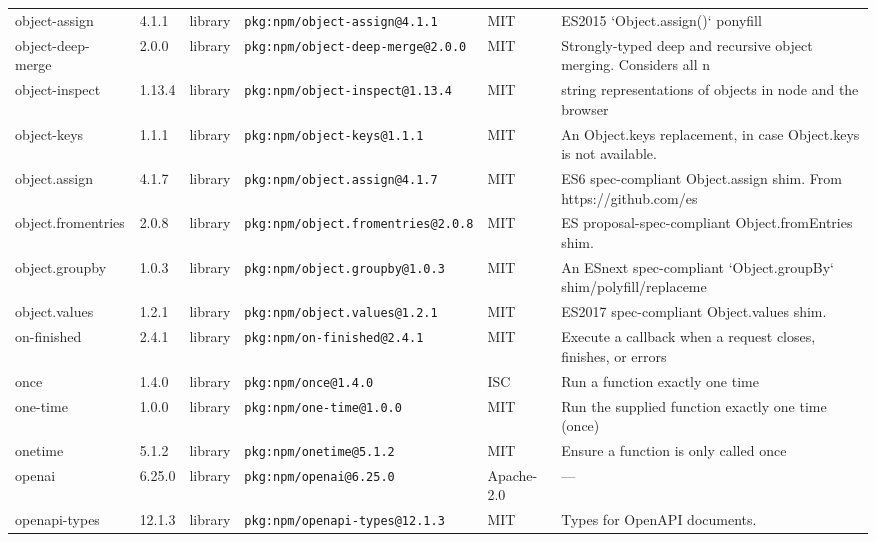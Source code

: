 \documentclass[11pt,a4paper]{article}
\begin{document}
\begin{longtable}{|p{4cm}|p{2cm}|p{1.6cm}|p{5cm}|p{1.5cm}|p{3.5cm}|}
\raggedright object-assign & 4.1.1 & library & \small\texttt{pkg:npm/object-assign@4.1.1} & MIT & \small ES2015 `Object.assign()` ponyfill \\
\raggedright object-deep-merge & 2.0.0 & library & \small\texttt{pkg:npm/object-deep-merge@2.0.0} & MIT & \small Strongly-typed deep and recursive object merging. Considers all n \\
\raggedright object-inspect & 1.13.4 & library & \small\texttt{pkg:npm/object-inspect@1.13.4} & MIT & \small string representations of objects in node and the browser \\
\raggedright object-keys & 1.1.1 & library & \small\texttt{pkg:npm/object-keys@1.1.1} & MIT & \small An Object.keys replacement, in case Object.keys is not available. \\
\raggedright object.assign & 4.1.7 & library & \small\texttt{pkg:npm/object.assign@4.1.7} & MIT & \small ES6 spec-compliant Object.assign shim. From https://github.com/es \\
\raggedright object.fromentries & 2.0.8 & library & \small\texttt{pkg:npm/object.fromentries@2.0.8} & MIT & \small ES proposal-spec-compliant Object.fromEntries shim. \\
\raggedright object.groupby & 1.0.3 & library & \small\texttt{pkg:npm/object.groupby@1.0.3} & MIT & \small An ESnext spec-compliant `Object.groupBy` shim/polyfill/replaceme \\
\raggedright object.values & 1.2.1 & library & \small\texttt{pkg:npm/object.values@1.2.1} & MIT & \small ES2017 spec-compliant Object.values shim. \\
\raggedright on-finished & 2.4.1 & library & \small\texttt{pkg:npm/on-finished@2.4.1} & MIT & \small Execute a callback when a request closes, finishes, or errors \\
\raggedright once & 1.4.0 & library & \small\texttt{pkg:npm/once@1.4.0} & ISC & \small Run a function exactly one time \\
\raggedright one-time & 1.0.0 & library & \small\texttt{pkg:npm/one-time@1.0.0} & MIT & \small Run the supplied function exactly one time (once) \\
\raggedright onetime & 5.1.2 & library & \small\texttt{pkg:npm/onetime@5.1.2} & MIT & \small Ensure a function is only called once \\
\raggedright openai & 6.25.0 & library & \small\texttt{pkg:npm/openai@6.25.0} & Apache-2.0 & \small — \\
\raggedright openapi-types & 12.1.3 & library & \small\texttt{pkg:npm/openapi-types@12.1.3} & MIT & \small Types for OpenAPI documents. \\

\end{longtable}
\end{document}
